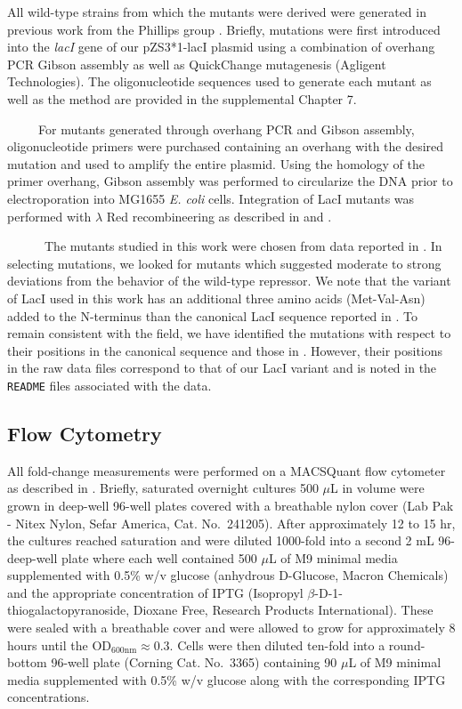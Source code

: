 \documentclass[12pt]{caltech_thesis}
\begin{document}
All wild-type strains from which the mutants were derived were generated
in previous work from the Phillips group
\autocite{garcia2011,razo-mejia2018}. Briefly, mutations were first
introduced into the \emph{lacI} gene of our pZS3*1-lacI plasmid
\autocite{garcia2011} using a combination of overhang PCR Gibson
assembly as well as QuickChange mutagenesis (Agligent Technologies). The
oligonucleotide sequences used to generate each mutant as well as the
method are provided in the supplemental Chapter 7.

~~~~~For mutants generated through overhang PCR and Gibson assembly,
oligonucleotide primers were purchased containing an overhang with the
desired mutation and used to amplify the entire plasmid. Using the
homology of the primer overhang, Gibson assembly was performed to
circularize the DNA prior to electroporation into MG1655 \emph{E. coli}
cells. Integration of LacI mutants was performed with \(\lambda\) Red
recombineering as described in \textcite{sharan2009} and
\textcite{garcia2011}.

~~~~~~The mutants studied in this work were chosen from data reported in
\textcite{daber2011}. In selecting mutations, we looked for mutants
which suggested moderate to strong deviations from the behavior of the
wild-type repressor. We note that the variant of LacI used in this work
has an additional three amino acids (Met-Val-Asn) added to the
N-terminus than the canonical LacI sequence reported in
\textcite{farabaugh1978}. To remain consistent with the field, we have
identified the mutations with respect to their positions in the
canonical sequence and those in \textcite{daber2011}. However, their
positions in the raw data files correspond to that of our LacI variant
and is noted in the \texttt{README} files associated with the data.

\hypertarget{flow-cytometry-1}{%
\subsection{Flow Cytometry}\label{flow-cytometry-1}}

All fold-change measurements were performed on a MACSQuant flow
cytometer as described in \textcite{razo-mejia2018}. Briefly, saturated
overnight cultures 500 \(\mu\)L in volume were grown in deep-well
96-well plates covered with a breathable nylon cover (Lab Pak - Nitex
Nylon, Sefar America, Cat. No.~241205). After approximately 12 to 15 hr,
the cultures reached saturation and were diluted 1000-fold into a second
2 mL 96-deep-well plate where each well contained 500 \(\mu\)L of M9
minimal media supplemented with 0.5\% w/v glucose (anhydrous D-Glucose,
Macron Chemicals) and the appropriate concentration of IPTG (Isopropyl
\(\beta\)-D-1-thiogalactopyranoside, Dioxane Free, Research Products
International). These were sealed with a breathable cover and were
allowed to grow for approximately 8 hours until the
OD\(_\text{600nm} \approx 0.3\). Cells were then diluted ten-fold into a
round-bottom 96-well plate (Corning Cat. No.~3365) containing 90
\(\mu\)L of M9 minimal media supplemented with 0.5\% w/v glucose along
with the corresponding IPTG concentrations.
\end{document}
